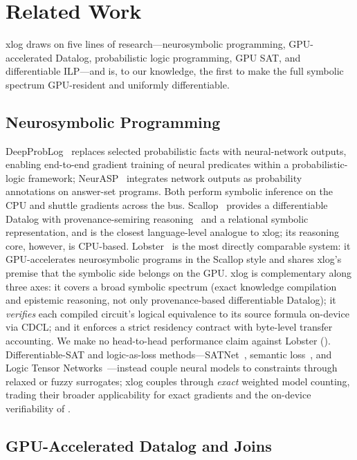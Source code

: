 \section{Related Work}\label{sec:related}

xlog draws on five lines of research---neurosymbolic programming, GPU-accelerated Datalog, probabilistic logic programming, GPU SAT, and differentiable ILP---and is, to our knowledge, the first to make the full symbolic spectrum GPU-resident and uniformly differentiable.

\subsection{Neurosymbolic Programming}

DeepProbLog~\cite{deepproblog} replaces selected probabilistic facts with neural-network outputs, enabling end-to-end gradient training of neural predicates within a probabilistic-logic framework; NeurASP~\cite{neurasp} integrates network outputs as probability annotations on answer-set programs. Both perform symbolic inference on the CPU and shuttle gradients across the bus. Scallop~\cite{scallop} provides a differentiable Datalog with provenance-semiring reasoning~\cite{green2007provenance} and a relational symbolic representation, and is the closest language-level analogue to xlog; its reasoning core, however, is CPU-based. Lobster~\cite{lobster} is the most directly comparable system: it GPU-accelerates neurosymbolic programs in the Scallop style and shares xlog's premise that the symbolic side belongs on the GPU. xlog is complementary along three axes: it covers a broad symbolic spectrum (exact knowledge compilation and epistemic reasoning, not only provenance-based differentiable Datalog); it \emph{verifies} each compiled circuit's logical equivalence to its source formula on-device via CDCL; and it enforces a strict residency contract with byte-level transfer accounting. We make no head-to-head performance claim against Lobster (). Differentiable-SAT and logic-as-loss methods---SATNet~\cite{satnet}, semantic loss~\cite{semanticloss}, and Logic Tensor Networks~\cite{ltn}---instead couple neural models to constraints through relaxed or fuzzy surrogates; xlog couples through \emph{exact} weighted model counting, trading their broader applicability for exact gradients and the on-device verifiability of .

\subsection{GPU-Accelerated Datalog and Joins}

